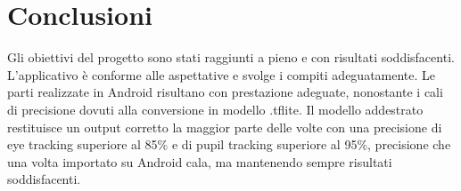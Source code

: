\documentclass[11pt]{article}
\begin{document}
\newpage
\section{Conclusioni}
Gli obiettivi del progetto sono stati raggiunti a pieno e con risultati soddisfacenti. 
\newline \newline
L’applicativo è
conforme alle aspettative e svolge i compiti adeguatamente.
Le parti realizzate
in Android risultano con prestazione adeguate, nonostante i cali di precisione dovuti alla conversione in modello .tflite.
\newline \newline
Il modello addestrato restituisce un output corretto la maggior parte delle volte con una precisione di eye tracking superiore al 85\% e di pupil tracking superiore al 95\%, precisione che una volta importato su Android cala, ma mantenendo sempre risultati soddisfacenti.
\end{document}
